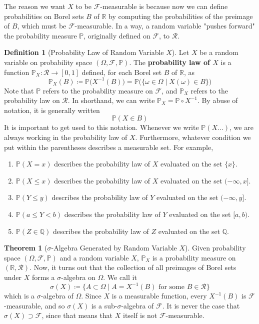 \documentclass{article}
\theoremstyle{definition}
\newtheorem{theorem}{Theorem}[section]
\theoremstyle{remark}
\theoremstyle{definition}
\newtheorem{definition}{Definition}[section]
\begin{document}
The reason we want $X$ to be $\mathcal{F}$-measurable is because now we can define probabilities on Borel sets $B$ of $\mathbb{R}$ by computing the probabilities of the preimage of $B$, which must be $\mathcal{F}$-measurable. In a way, a random variable "pushes forward" the probability measure $\mathbb{P}$, originally defined on $\mathcal{F}$, to $\mathcal{R}$.  

\begin{definition}[Probability Law of Random Variable $X$]
Let $X$ be a random variable on probability space $(\Omega, \mathcal{F}, \mathbb{P})$. The \textbf{probability law of $X$} is a function $\mathbb{P}_X : \mathcal{R} \longrightarrow [0, 1]$ defined, for each Borel set $B$ of $\mathbb{R}$, as 
\[\mathbb{P}_X (B) \coloneqq \mathbb{P} \big( X^{-1}(B) \big) = \mathbb{P} \big( \{\omega \in \Omega \mid X(\omega) \in B\} \big)\]
Note that $\mathbb{P}$ refers to the probability measure on $\mathcal{F}$, and $\mathbb{P}_X$ refers to the probability law on $\mathcal{R}$. In shorthand, we can write $\mathbb{P}_X = \mathbb{P} \circ X^{-1}$. By abuse of notation, it is generally written
\[\mathbb{P}(X \in B)\] 
It is important to get used to this notation. Whenever we write $\mathbb{P}(X \ldots)$, we are always working in the probability law of $X$. Furthermore, whatever condition we put within the parentheses describes a measurable set. For example, 
\begin{enumerate}
    \item $\mathbb{P}(X = x)$ describes the probability law of $X$ evaluated on the set $\{x\}$. 
    \item $\mathbb{P}(X \leq x)$ describes the probability law of $X$ evaluated on the set $(-\infty, x]$. 
    \item $\mathbb{P}(Y \leq y)$ describes the probability law of $Y$ evaluated on the set $(-\infty, y]$.
    \item $\mathbb{P}(a \leq Y < b)$ describes the probability law of $Y$ evaluated on the set $[a, b)$. 
    \item $\mathbb{P}(Z \in \mathbb{Q})$ describes the probability law of $Z$ evaluated on the set $\mathbb{Q}$. 
\end{enumerate}
\end{definition}

\begin{theorem}[$\sigma$-Algebra Generated by Random Variable $X$]
Given probability space $(\Omega, \mathcal{F}, \mathbb{P})$ and a random variable $X$, $\mathbb{P}_X$ is a probability measure on $(\mathbb{R}, \mathcal{R})$. Now, it turns out that the collection of all preimages of Borel sets under $X$ forms a $\sigma$-algebra on $\Omega$. We call it 
\[\sigma(X) \coloneqq \big\{ A \subset \Omega \mid A = X^{-1}(B) \text{ for some } B \in \mathcal{R} \big\}\]
which is a $\sigma$-algebra of $\Omega$. Since $X$ is a measurable function, every $X^{-1}(B)$ is $\mathcal{F}$-measurable, and so $\sigma(X)$ is a sub-$\sigma$-algebra of $\mathcal{F}$. It is never the case that $\sigma(X) \supset \mathcal{F}$, since that means that $X$ itself is not $\mathcal{F}$-measurable. 
\end{theorem}
\end{document}
